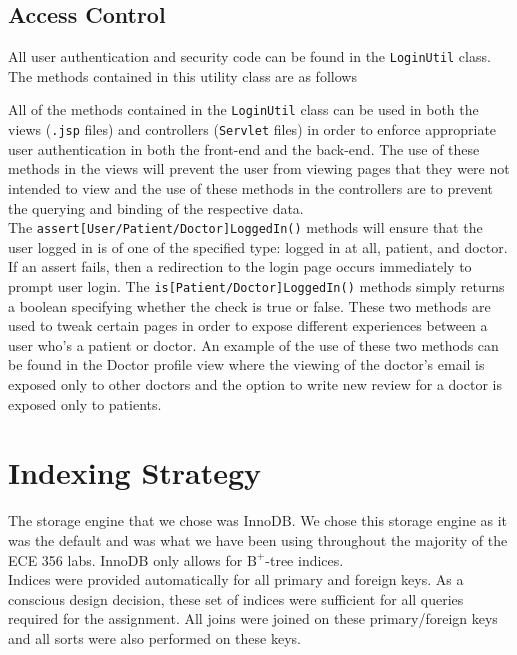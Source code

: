 \documentclass{article}
\begin{document}
\subsection{Access Control}
All user authentication and security code can be found in the \texttt{LoginUtil} class. The methods contained in this utility class are as follows



All of the methods contained in the \texttt{LoginUtil} class can be used in both the views (\texttt{.jsp} files) and controllers (\texttt{Servlet} files) in order to enforce appropriate user authentication in both the front-end and the back-end. The use of these methods in the views will prevent the user from viewing pages that they were not intended to view and the use of these methods in the controllers are to prevent the querying and binding of the respective data. \\

The \texttt{assert[User/Patient/Doctor]LoggedIn()} methods will ensure that the user logged in is of one of the specified type: logged in at all, patient, and doctor. If an assert fails, then a redirection to the login page occurs immediately to prompt user login. The \texttt{is[Patient/Doctor]LoggedIn()} methods simply returns a boolean specifying whether the check is true or false. These two methods are used to tweak certain pages in order to expose different experiences between a user who's a patient or doctor. An example of the use of these two methods can be found in the Doctor profile view where the viewing of the doctor's email is exposed only to other doctors and the option to write new review for a doctor is exposed only to patients.


\section{Indexing Strategy}
The storage engine that we chose was InnoDB. We chose this storage engine as it was the default and was what we have been using throughout the majority of the ECE 356 labs. InnoDB only allows for $\mathrm{B}^+$-tree indices. \\

Indices were provided automatically for all primary and foreign keys. As a conscious design decision, these set of indices were sufficient for all queries required for the assignment. All joins were joined on these primary/foreign keys and all sorts were also performed on these keys. \\
\end{document}
